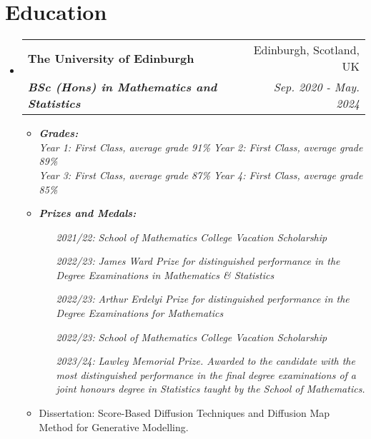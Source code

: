 \documentclass[12pt, a4paper]{article}
\makeatletter
\newcommand{\resumeSection}[1]{
    \section*{#1}
}
\newcommand{\resumeSectionItm}[4]{
\item
    \begin{tabular*}{0.96\textwidth}{@{}l@{\extracolsep{\fill}}r@{}}
        \textbf{#1} & #2 \\
        \textit{\textbf{#3}} & \textit{#4}
    \end{tabular*}
}
\makeatother
\begin{document}
\resumeSection{Education}
\begin{itemize}[leftmargin=*]
    \resumeSectionItm
    {The University of Edinburgh}{Edinburgh, Scotland, UK}
    {BSc (Hons) in Mathematics and Statistics}{Sep. 2020 - May. 2024}
    \begin{itemize}[leftmargin=*]
        \vspace{-1mm}
        \item \it{\textbf{Grades:}}\\
            \it{Year 1: First Class, average grade 91\%}
            \hspace{5mm}\it{Year 2: First Class, average grade 89\%}\\
            \it{Year 3: First Class, average grade 87\%}
            \hspace{5mm}\it{Year 4: First Class, average grade 85\%}
        \item \it{\textbf{Prizes and Medals:}}
            \begin{itemize}[
                align=left,
                leftmargin=4em,
                itemindent=0.5pt,
                labelsep=0pt,
                labelwidth=4em
                ]
                \item [\it{2021/22:}]
                    \it{School of Mathematics College Vacation Scholarship}
                \item [\it{2022/23:}]
                    \it{James Ward Prize for distinguished performance in the
                        Degree Examinations in Mathematics \& Statistics}
                \item [\it{2022/23:}]
                    \it{Arthur Erdelyi Prize for distinguished
                    performance in the Degree Examinations for Mathematics}
                \item [\it{2022/23:}]
                    \it{School of Mathematics College Vacation Scholarship}
                \item [\it{2023/24:}]
                    \it{Lawley Memorial Prize. Awarded to the candidate with the most distinguished performance in the final degree examinations of a joint honours degree in Statistics taught by the School of Mathematics.}
            \end{itemize}
        \item Dissertation: Score-Based Diffusion Techniques and Diffusion Map Method for Generative Modelling.
    \end{itemize}
\end{itemize}
\end{document}
